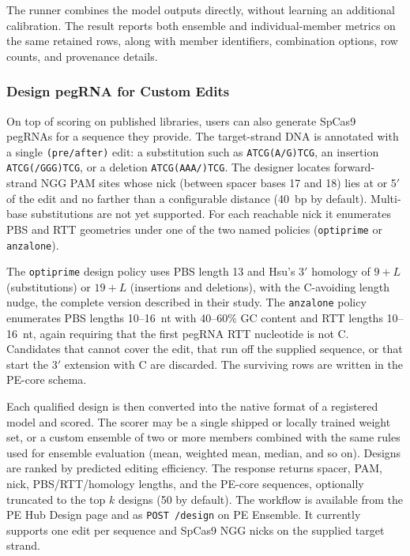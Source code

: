 \documentclass{article}
\begin{document}
The runner combines the model outputs directly, without learning an additional calibration. The result reports both ensemble and individual-member metrics on the same retained rows, along with member identifiers, combination options, row counts, and provenance details.

\subsubsection{Design pegRNA for Custom Edits}

On top of scoring on published libraries, users can also generate SpCas9 pegRNAs for a sequence they provide. The target-strand DNA is annotated with a single \texttt{(pre/after)} edit: a substitution such as \texttt{ATCG(A/G)TCG}, an insertion \texttt{ATCG(/GGG)TCG}, or a deletion \texttt{ATCG(AAA/)TCG}. The designer locates forward-strand NGG PAM sites whose nick (between spacer bases 17 and 18) lies at or 5$'$ of the edit and no farther than a configurable distance (40~bp by default). Multi-base substitutions are not yet supported. For each reachable nick it enumerates PBS and RTT geometries under one of the two named policies (\nolinkurl{optiprime} or \nolinkurl{anzalone}).

The \nolinkurl{optiprime} design policy uses PBS length 13 and Hsu's 3$'$ homology of $9+L$ (substitutions) or $19+L$ (insertions and deletions), with the C-avoiding length nudge, the complete version described in their study. The \nolinkurl{anzalone} policy enumerates PBS lengths 10--16~nt with 40--60\% GC content and RTT lengths 10--16~nt, again requiring that the first pegRNA RTT nucleotide is not C. Candidates that cannot cover the edit, that run off the supplied sequence, or that start the 3$'$ extension with C are discarded. The surviving rows are written in the PE-core schema.

Each qualified design is then converted into the native format of a registered model and scored. The scorer may be a single shipped or locally trained weight set, or a custom ensemble of two or more members combined with the same rules used for ensemble evaluation (mean, weighted mean, median, and so on). Designs are ranked by predicted editing efficiency. The response returns spacer, PAM, nick, PBS/RTT/homology lengths, and the PE-core sequences, optionally truncated to the top $k$ designs (50 by default). The workflow is available from the PE Hub Design page and as \nolinkurl{POST /design} on PE Ensemble. It currently supports one edit per sequence and SpCas9 NGG nicks on the supplied target strand.  
\end{document}
